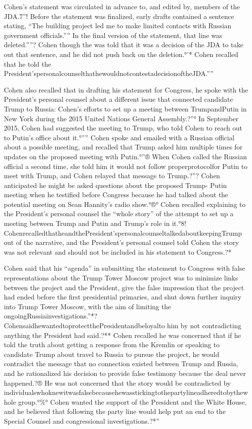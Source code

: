 Cohen's statement was circulated in advance to, and edited by, members of the JDA.7”!
Before the statement was finalized, early drafts contained a sentence stating, “The building project led me to make limited contacts with Russian government officials.””
In the final version of the statement, that line was deleted.””?
Cohen though the was told that it was a decision of the JDA to take out that sentence, and he did not push back on the deletion.°'*
Cohen recalled that he told the President'spersonalcounselthathewouldnotcontestadecisionoftheJDA.””

Cohen also recalled that in drafting his statement for Congress, he spoke with the President's personal counsel about a different issue that connected candidate Trump to Russia: Cohen's efforts to set up a meeting between TrumpandPutin in New York during the 2015 United Nations General Assembly.?”°
In September 2015, Cohen had suggested the meeting to Trump, who told Cohen to reach out to Putin's office about it.°””
Cohen spoke and emailed with a Russian official about a possible meeting, and recalled that Trump asked him multiple times for updates on the proposed meeting with Putin.°”®
When Cohen called the Russian official a second time, she told him it would not follow properprotocolfor Putin to meet with Trump, and Cohen relayed that message to Trump.?”?
Cohen anticipated he might be asked questions about the proposed Trump- Putin meeting when he testified before Congress because he had talked about the potential meeting on Sean Hannity's radio show.°®°
Cohen recalled explaining to the President's personal counsel the “whole story” of the attempt to set up a meeting between Trump and Putin and Trump's role in it.°8!
CohenrecalledthatheandthePresident'spersonalcounseltalkedaboutkeepingTrump out of the narrative, and the President's personal counsel told Cohen the story was not relevant and should not be included in his statement to Congress.?*

Cohen said that his “agenda” in submitting the statement to Congress with false representations about the Trump Tower Moscow project was to minimize links between the project and the President, give the false impression that the project had ended before the first presidential primaries, and shut down further inquiry into Trump Tower Moscow, with the aim of limiting the ongoingRussiainvestigations.”*?
CohensaidhewantedtoprotectthePresidentandbeloyalto him by not contradicting anything the President had said.?**
Cohen recalled he was concerned that if he told the truth about getting a response from the Kremlin or speaking to candidate Trump about travel to Russia to pursue the project, he would contradict the message that no connection existed between Trump and Russia, and he rationalized his decision to provide false testimony because the deal never happened.?®
He was not concerned that the story would be contradicted by individualswhoknewitwasfalsebecausehewasstickingtothepartylineadheredtobythewhole group.°\%°
Cohen wanted the support of the President and the White House, and he believed that following the party line would help put an end to the Special Counsel and congressional investigations.?*”


